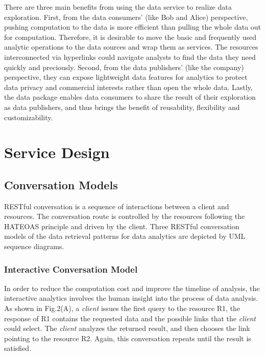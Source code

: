 \documentclass[10pt, conference, compsocconf]{IEEEtran}
\begin{document}
There are three main benefits from using the data service to realize data exploration. First, from the data consumers’ (like Bob and Alice) perspective, pushing computation to the data is more efficient than pulling the whole data out for computation. Therefore, it is desirable to move the basic and frequently used analytic operations to the data sources and wrap them as services. The resources interconnected via hyperlinks could navigate analysts to find the data they need quickly and preciously. Second, from the data publishers’ (like the company) perspective, they can expose lightweight data features for analytics to protect data privacy and commercial interests rather than open the whole data. Lastly, the data package enables data consumers to share the result of their exploration as data publishers, and thus brings the benefit of reusability, flexibility and customizability.
\section{Service Design}
\subsection{Conversation Models}

RESTful conversation\cite{haupt2015conversation} is a sequence of interactions between a client and resources. The conversation route is controlled by the resources following the HATEOAS principle and driven by the client. Three RESTful conversation models of the data retrieval patterns for data analytics are depicted by UML sequence diagrams.

\subsubsection{Interactive Conversation Model}
In order to reduce the computation cost and improve the timeline of analysis, the interactive analytics involves the human insight into the process of data analysis. As shown in Fig.2(A), a \textit{client} issues the first query to the resource R1, the response of R1 contains the requested data and the possible links that the \textit{client} could select. The \textit{client} analyzes the returned result, and then chooses the link pointing to the resource R2. Again, this conversation repeats until the result is satisfied.
\end{document}
